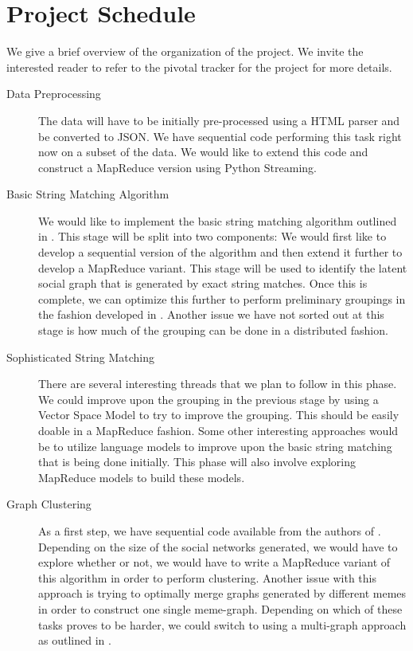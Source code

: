 \documentclass{acm_proc_article-sp}
\begin{document}
\section{Project Schedule}
We give a brief overview of the organization of the project. We invite the interested reader to refer to the pivotal tracker for the project for more details. 
\begin{description}
\item[Data Preprocessing]The data will have to be initially pre-processed using a HTML parser and be converted to JSON. We have sequential code performing this task right now on a subset of the data. We would like to extend this code and construct a MapReduce version using Python Streaming. 
\item[Basic String Matching Algorithm] We would like to implement the basic string matching algorithm outlined in \cite{kolak2008generating}. This stage will be split into two components: We would first like to develop a sequential version of the algorithm and then extend it further to develop a MapReduce variant. This stage will be used to identify the latent social graph that is generated by exact string matches. Once this is complete, we can optimize this further to perform preliminary groupings in the fashion developed in \cite{kolak2008generating}. Another issue we have not sorted out at this stage is how much of the grouping can be done in a distributed fashion. 
\item [Sophisticated String Matching] There are several interesting threads that we plan to follow in this phase. We could improve upon the grouping in the previous stage by using a Vector Space Model to try to improve the grouping. This should be easily doable in a MapReduce fashion. Some other interesting approaches would be to utilize language models to improve upon the basic string matching that is being done initially. 
This phase will also involve exploring MapReduce models to build these models. 
\item [Graph Clustering] As a first step, we have sequential code available from the authors of \cite{blondel2008fast}. Depending on the size of the social networks generated, we  would have to explore whether or not, we would have to write a MapReduce variant of this algorithm in order to perform clustering. Another issue with this approach is trying to optimally merge graphs generated by different memes in order to construct one single meme-graph. Depending on which of these tasks proves to be harder, we could switch to using a multi-graph approach as outlined in  \cite{tang2009clustering}.
\end{description}
\end{document}
